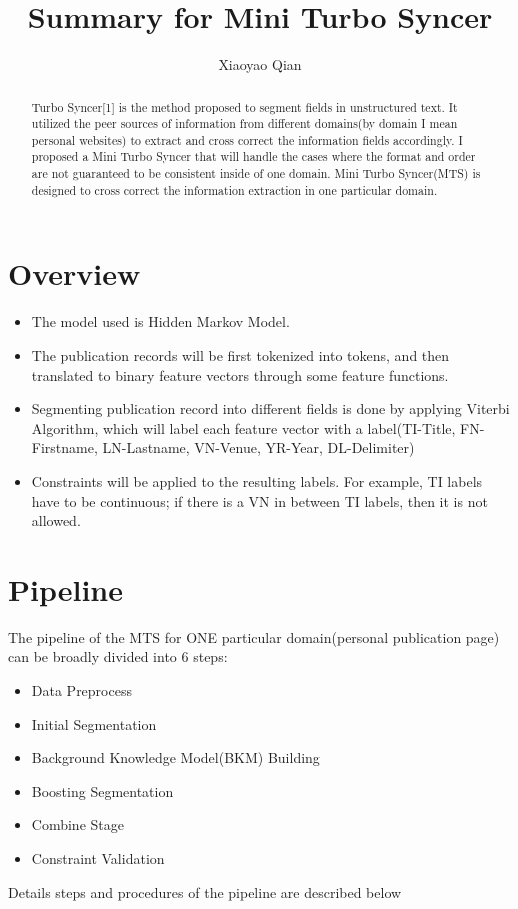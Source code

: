 \documentclass[11pt]{article}
\author{Xiaoyao Qian}
\title{Summary for Mini Turbo Syncer}
\date{}
\begin{document}
\maketitle

\begin{abstract}
Turbo Syncer[1] is the method proposed to segment fields in unstructured text. It utilized the peer sources of information from different domains(by domain I mean personal websites) to extract and cross correct the information fields accordingly. I proposed a Mini Turbo Syncer that will handle the cases where the format and order are not guaranteed to be consistent inside of one domain. Mini Turbo Syncer(MTS) is designed to cross correct the information extraction in one particular domain.
\end{abstract}

\section{Overview}
\begin{itemize}
\item The model used is Hidden Markov Model.
\item The publication records will be first tokenized into tokens, and then translated to binary feature vectors through some feature functions.
\item Segmenting publication record into different fields is done by applying Viterbi Algorithm, which will label each feature vector with a label(TI-Title, FN-Firstname, LN-Lastname, VN-Venue, YR-Year, DL-Delimiter)
\item Constraints will be applied to the resulting labels. For example, TI labels have to be continuous; if there is a VN in between TI labels, then it is not allowed. 
\end{itemize}


\section{Pipeline}
The pipeline of the MTS for ONE particular domain(personal publication page) can be broadly divided into 6 steps: 
\begin{itemize}
\item Data Preprocess
\item Initial Segmentation
\item Background Knowledge Model(BKM) Building
\item Boosting Segmentation
\item Combine Stage
\item Constraint Validation
\end{itemize}
Details steps and procedures of the pipeline are described below
\end{document}
